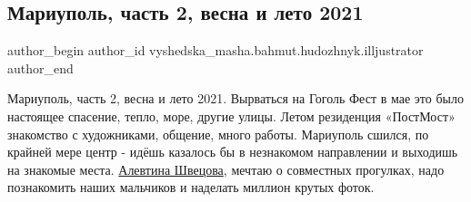  
 
 
 
 

\subsection{Мариуполь, часть 2, весна и лето 2021}
\label{sec:07_12_2021.fb.vyshedska_masha.bahmut.hudozhnyk.illjustrator.1.mariupol__chast_2__v}

\ifcmt
 author_begin
   author_id vyshedska_masha.bahmut.hudozhnyk.illjustrator
 author_end
\fi

Мариуполь, часть 2, весна и лето 2021. Вырваться на Гоголь Фест в мае это было
настоящее спасение, тепло, море, другие улицы. Летом резиденция «ПостМост»
знакомство с художниками, общение, много работы. Мариуполь сшился, по крайней
мере центр - идёшь казалось бы в незнакомом направлении и выходишь на знакомые
места. \href{https://www.facebook.com/shvetsova.alevtina}{Алевтина Швецова},
мечтаю о совместных прогулках, надо познакомить наших мальчиков и наделать
миллион крутых фоток.



